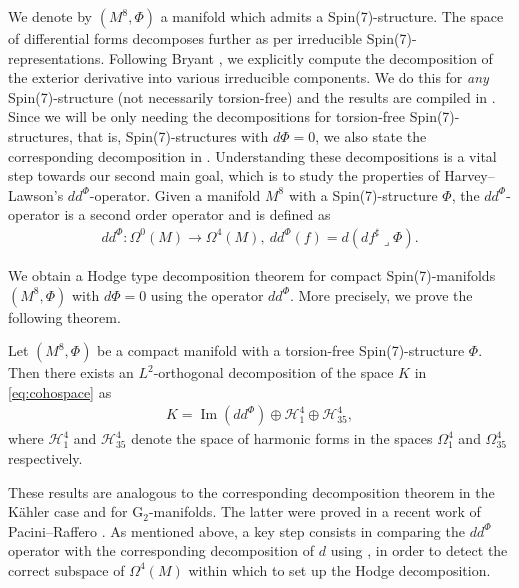 \documentclass[10pt,a4paper,reqno]{article}
\theoremstyle{definition}
\numberwithin{equation}{section}
\def\G2{\mathrm{G}_2}
\def\ddphi{dd^{\Phi}}
\def\cH{\mathcal{H}}
\DeclareMathOperator{\Ima}{Im}
\begin{document}
\medskip

We denote by $(M^8, \Phi)$ a manifold which admits a Spin(7)-structure. The space of differential forms decomposes further as per irreducible Spin(7)-representations. Following Bryant \cite{bryant-someremarks}, we explicitly compute the decomposition of the exterior derivative into various irreducible components. We do this for \emph{any} Spin(7)-structure (not necessarily torsion-free) and the results are compiled in . Since we will be only needing the decompositions for torsion-free Spin(7)-structures, that is, Spin(7)-structures with $d\Phi=0$, we also state the corresponding decomposition in . Understanding these decompositions is a vital step towards our second main goal, which is to study the properties of Harvey--Lawson's $\ddphi$-operator. Given a manifold $M^8$ with a Spin(7)-structure $\Phi$, the $\ddphi$-operator is a second order operator and is defined as
\begin{align*}
\ddphi: \Omega^0(M)\rightarrow \Omega^4(M),\ \ddphi(f) = d(df^{\sharp}\lrcorner \Phi).
\end{align*}


\medskip

We obtain a Hodge type decomposition theorem for compact Spin(7)-manifolds $(M^8, \Phi)$ with $d\Phi=0$ using the operator $dd^\Phi$. More precisely, we prove the following theorem.

\medskip

\noindent
\textbf{} Let $(M^8, \Phi)$ be a compact manifold with a torsion-free Spin(7)-structure $\Phi$. Then there exists an $L^2$-orthogonal decomposition of the space $K$ in \cref{eq:cohospace} as
\begin{align}\label{eq:Spin7Hodgeintro}
K=\Ima(\ddphi) \oplus \cH^4_1\oplus \cH^4_{35},
\end{align}
where $\cH^4_1$ and $\cH^4_{35}$ denote the space of harmonic forms in the spaces $\Omega^4_1$ and $\Omega^4_{35}$ respectively.

\medskip

These results are analogous to the corresponding decomposition theorem in the K\"ahler case and for $\G2$-manifolds. The latter were proved in a recent work of Pacini--Raffero \cite[Thm. 5.12]{pacini-raferro-pluripotential}. As mentioned above, a key step consists in comparing the $dd^\Phi$ operator with the corresponding decomposition of $d$ using , in order to detect the correct subspace of $\Omega^4(M)$ within which to set up the Hodge decomposition.
\end{document}
